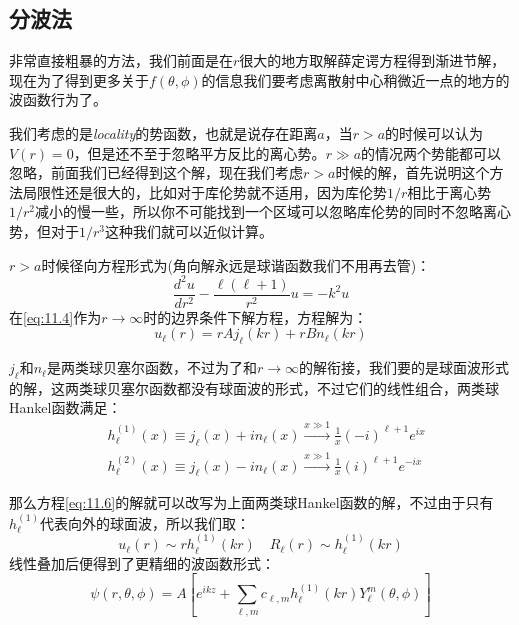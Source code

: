 \documentclass[a4paper,zihao=-4,linespread=1]{ctexrep}
\begin{document}
	\subsection{分波法}
	非常直接粗暴的方法，我们前面是在$r$很大的地方取解薛定谔方程得到渐进节解，现在为了得到更多关于$f(\theta,\phi)$的信息我们要考虑离散射中心稍微近一点的地方的波函数行为了。
	
	我们考虑的是{\itshape locality}的势函数，也就是说存在距离$a$，当$r>a$的时候可以认为$V(r)=0$，但是还不至于忽略平方反比的离心势。$r\gg a$的情况两个势能都可以忽略，前面我们已经得到这个解，现在我们考虑$r>a$时候的解，首先说明这个方法局限性还是很大的，比如对于库伦势就不适用，因为库伦势$1/r$相比于离心势$1/r^2$减小的慢一些，所以你不可能找到一个区域可以忽略库伦势的同时不忽略离心势，但对于$1/r^3$这种我们就可以近似计算。
	
	$r>a$时候径向方程形式为(角向解永远是球谐函数我们不用再去管)：
	\begin{equation}
		\label{eq:11.6}
		\frac{d^2u}{dr^2}-\frac{\ell(\ell+1)}{r^2}u=-k^2u
	\end{equation}
	在\ref{eq:11.4}作为$r\to\infty$时的边界条件下解方程，方程解为：
	\[u_\ell(r)=rAj_\ell(kr)+rBn_\ell(kr)\]
	
	$j_\ell$和$n_\ell$是两类球贝塞尔函数，不过为了和$r\to\infty$的解衔接，我们要的是球面波形式的解，这两类球贝塞尔函数都没有球面波的形式，不过它们的线性组合，两类球Hankel函数满足：
	\begin{align*}
	&h^{(1)}_\ell(x)\equiv j_\ell(x)+in_\ell(x)\xrightarrow{x\gg1}\frac{1}{x}(-i)^{\ell+1}e^{ix}\\
	&h^{(2)}_\ell(x)\equiv j_\ell(x)-in_\ell(x)\xrightarrow{x\gg1}\frac{1}{x}(i)^{\ell+1}e^{-ix}
	\end{align*}
	
	那么方程\ref{eq:11.6}的解就可以改写为上面两类球Hankel函数的解，不过由于只有$h^{(1)}_\ell$代表向外的球面波，所以我们取：
	\[u_\ell(r)\sim rh^{(1)}_\ell(kr)\quad R_\ell(r)\sim h^{(1)}_\ell(kr)\]
	线性叠加后便得到了更精细的波函数形式：
	\begin{equation}
		\psi(r,\theta,\phi)=A\left[e^{ikz}+\sum_{\ell,m}c_{\ell,m}h^{(1)}_\ell(kr)Y^m_\ell(\theta,\phi)\right]
	\end{equation}
\end{document}
